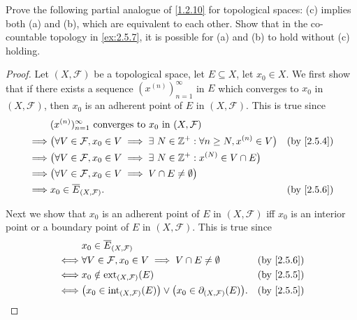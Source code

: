 \begin{ex}\label{ex:2.5.10}
  Prove the following partial analogue of \cref{1.2.10} for topological spaces:
  (c) implies both (a) and (b), which are equivalent to each other.
  Show that in the co-countable topology in \cref{ex:2.5.7}, it is possible for (a) and (b) to hold without (c) holding.
\end{ex}

\begin{proof}
  Let \((X, \mathcal{F})\) be a topological space, let \(E \subseteq X\), let \(x_0 \in X\).
  We first show that if there exists a sequence \((x^{(n)})_{n = 1}^\infty\) in \(E\) which converges to \(x_0\) in \((X, \mathcal{F})\), then \(x_0\) is an adherent point of \(E\) in \((X, \mathcal{F})\).
  This is true since
  \begin{align*}
             & (x^{(n)})_{n = 1}^\infty \text{ converges to } x_0 \text{ in } (X, \mathcal{F})                                                          \\
    \implies & \big(\forall V \in \mathcal{F}, x_0 \in V \implies \exists\ N \in \Z^+ : \forall n \geq N, x^{(n)} \in V\big) & \text{(by \cref{2.5.4})} \\
    \implies & \big(\forall V \in \mathcal{F}, x_0 \in V \implies \exists\ N \in \Z^+ : x^{(N)} \in V \cap E\big)                                       \\
    \implies & \big(\forall V \in \mathcal{F}, x_0 \in V \implies V \cap E \neq \emptyset\big)                                                          \\
    \implies & x_0 \in \overline{E}_{(X, \mathcal{F})}.                                                                      & \text{(by \cref{2.5.6})}
  \end{align*}

  Next we show that \(x_0\) is an adherent point of \(E\) in \((X, \mathcal{F})\) iff \(x_0\) is an interior point or a boundary point of \(E\) in \((X, \mathcal{F})\).
  This is true since
  \begin{align*}
         & x_0 \in \overline{E}_{(X, \mathcal{F})}                                                                                              \\
    \iff & \forall V \in \mathcal{F}, x_0 \in V \implies V \cap E \neq \emptyset                                     & \text{(by \cref{2.5.6})} \\
    \iff & x_0 \notin \text{ext}_{(X, \mathcal{F})}(E)                                                               & \text{(by \cref{2.5.5})} \\
    \iff & \big(x_0 \in \text{int}_{(X, \mathcal{F})}(E)\big) \lor \big(x_0 \in \partial_{(X, \mathcal{F})}(E)\big). & \text{(by \cref{2.5.5})}
  \end{align*}


\end{proof}
